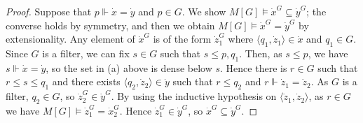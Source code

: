 \begin{proof}
    Suppose that \( p \Vdash \dot x = \dot y \) and \( p \in G \).
    We show \( M[G] \vDash \dot x^G \subseteq \dot y^G \); the converse holds by symmetry, and then we obtain \( M[G] \vDash \dot x^G = \dot y^G \) by extensionality.
    Any element of \( \dot x^G \) is of the form \( \dot z_1^G \) where \( \langle q_1, \dot z_1 \rangle \in \dot x \) and \( q_1 \in G \).
    Since \( G \) is a filter, we can fix \( s \in G \) such that \( s \leq p, q_1 \).
    Then, as \( s \leq p \), we have \( s \Vdash \dot x = \dot y \), so the set in (a) above is dense below \( s \).
    Hence there is \( r \in G \) such that \( r \leq s \leq q_1 \) and there exists \( \langle q_2, \dot z_2 \rangle \in \dot y \) such that \( r \leq q_2 \) and \( r \Vdash \dot z_1 = \dot z_2 \).
    As \( G \) is a filter, \( q_2 \in G \), so \( \dot z_2^G \in \dot y^G \).
    By using the inductive hypothesis on \( \langle \dot z_1, \dot z_2 \rangle \), as \( r \in G \) we have \( M[G] \vDash \dot z_1^G = \dot x_2^G \).
    Hence \( \dot z_1^G \in \dot y^G \), so \( \dot x^G \subseteq \dot y^G \).


\end{proof}

